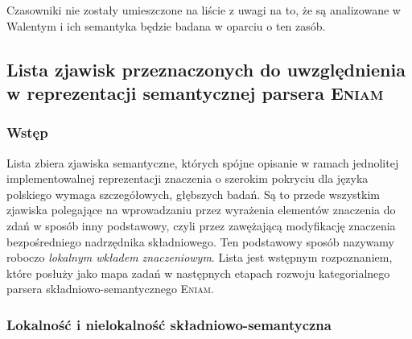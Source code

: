 \documentclass[12pt]{mwart}
\theoremstyle{remark}
\newcommand{\eniam}{\textsc{Eniam}}
\begin{document}
Czasowniki nie zostały umieszczone na liście z uwagi na to, że są analizowane w Walentym i
ich semantyka będzie badana w oparciu o ten zasób.

\subsection{Lista zjawisk przeznaczonych do uwzględnienia w reprezentacji semantycznej parsera \textsc{Eniam}}\label{zjawiska}




		

\subsubsection{Wstęp} %

Lista zbiera zjawiska semantyczne, których spójne opisanie w ramach jednolitej implementowalnej reprezentacji znaczenia o szerokim pokryciu dla języka polskiego wymaga szczegółowych, głębszych badań.
Są to przede wszystkim zjawiska polegające na wprowadzaniu przez wyrażenia elementów znaczenia do zdań w sposób inny podstawowy, czyli przez zawężającą modyfikację znaczenia bezpośredniego nadrzędnika składniowego.
Ten podstawowy sposób nazywamy roboczo \emph{lokalnym wkładem znaczeniowym}.
Lista jest wstępnym rozpoznaniem, które posłuży jako mapa zadań w następnych etapach rozwoju kategorialnego parsera składniowo-semantycznego \eniam.



\subsubsection{Lokalność i nielokalność składniowo-semantyczna}
\end{document}
